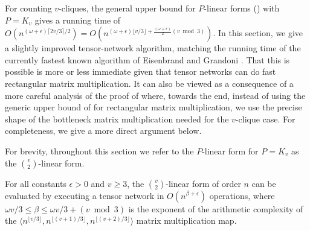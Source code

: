 \documentclass{toc}
\newcommand{\bra}{\ensuremath{\langle}}
\newcommand{\ket}{\ensuremath{\rangle}}
\begin{document}
For counting $v$-cliques, the general upper bound for $P$-linear forms
() with $P=K_v$ gives a running time of
$O(n^{(\omega+\epsilon)\lceil 2v/3 \rceil /2}) = O(n^{(\omega +
  \epsilon)\lfloor v/3 \rfloor + \tfrac{(\omega+\epsilon)}{2}(v \bmod
  3)})$.  In this section, we give a slightly improved tensor-network
algorithm, matching the running time of the currently fastest known algorithm
of Eisenbrand and Grandoni \cite{EisenbrandG2004}.  That this is possible
is more or less immediate given that tensor networks can do fast rectangular
matrix multiplication.  It can also be viewed as a consequence of a more
careful analysis of the proof of  where,
towards the end, instead of using the generic upper bound of
 for rectangular matrix
multiplication, we use the precise shape of the bottleneck matrix
multiplication needed for the $v$-clique case. For completeness,
we give a more direct argument below.

For brevity, throughout this section we refer to the $P$-linear form
for $P=K_v$ as the $\binom{v}{2}$-linear form.
\begin{lemma}
  \label{lem:v choose 2 linear form upper bound}
For all constants $\epsilon>0$ and $v \geq 3$, the $\binom{v}{2}$-linear form of order $n$
can be evaluated by executing a tensor network in
$O(n^{\beta+\epsilon})$ operations, where $\omega v/3 \le \beta \le \omega v/3 + (v \bmod 3)$ is the exponent of the arithmetic complexity of the $\bra n^{\lfloor v/3 \rfloor}, n^{\lfloor (v+1)/3 \rfloor}, n^{\lfloor (v+2)/3 \rfloor} \ket$ matrix multiplication map.
\end{lemma}
\end{document}
